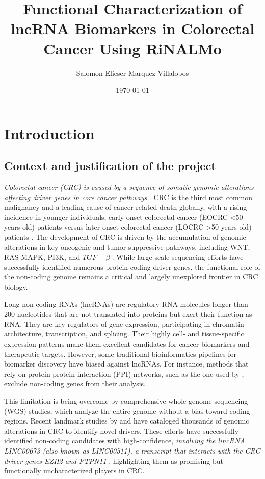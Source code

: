 \documentclass[ENG]{TFUOC}%
\title{Functional Characterization of lncRNA Biomarkers in Colorectal Cancer Using RiNALMo}
\author{Salomon Elieser Marquez Villalobos}
\date{\today}
\begin{document}
\estructura




\chapter{Introduction}

\section{Context and justification of the project}

\textit{Colorectal cancer (CRC) is caused by a sequence of somatic genomic alterations affecting driver genes in core cancer pathways} \cite{vogelsteinCancerGenomeLandscapes2013}. CRC is the third most common malignancy and a leading cause of cancer-related death globally, with a rising incidence in younger individuals, early-onset colorectal cancer (EOCRC \textless 50 years old) patients versus later-onset colorectal cancer (LOCRC \textgreater 50 years old) patients \cite{marxIdentificationDifferentiallyExpressed2024}. 
The development of CRC is driven by the accumulation of genomic alterations in key oncogenic and tumor-suppressive pathways, including WNT, RAS-MAPK, PI3K, and $TGF-\beta$ \cite{nunesPrognosticGenomeTranscriptome2024}. While large-scale sequencing efforts have successfully identified numerous protein-coding driver genes, the functional role of the non-coding genome remains a critical and largely unexplored frontier in CRC biology.

Long non-coding RNAs (lncRNAs) are regulatory RNA molecules longer than 200 nucleotides that are not translated into proteins but exert their function as RNA. They are key regulators of gene expression, participating in chromatin architecture, transcription, and splicing. Their highly cell- and tissue-specific expression patterns make them excellent candidates for cancer biomarkers and therapeutic targets. However, some traditional bioinformatics pipelines for biomarker discovery have biased against lncRNAs. For instance, methods that rely on protein-protein interaction (PPI) networks, such as the one used by \cite{vaziri-moghadamIntegratingMachineLearning2024}, exclude non-coding genes from their analysis.

This limitation is being overcome by comprehensive whole-genome sequencing (WGS) studies, which analyze the entire genome without a bias toward coding regions. Recent landmark studies by \cite{cornishGenomicLandscape20232024a} and \cite{nunesPrognosticGenomeTranscriptome2024} have cataloged thousands of genomic alterations in CRC to identify novel drivers. These efforts have successfully identified non-coding candidates with high-confidence, \textit{involving the lincRNA LINC00673 (also known as LINC00511), a transcript that interacts with the CRC driver genes EZH2 and PTPN11} \cite{cornishGenomicLandscape20232024a}, highlighting them as promising but functionally uncharacterized players in CRC.
\end{document}
